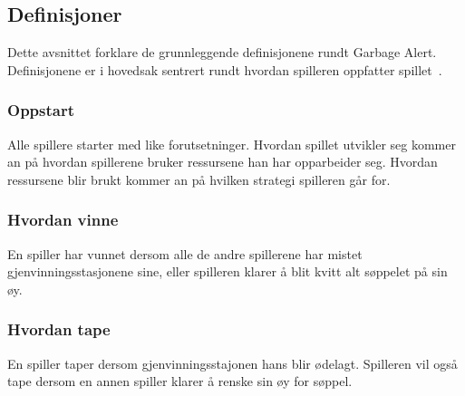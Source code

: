 \subsection{Definisjoner}
Dette avsnittet forklare de grunnleggende definisjonene rundt Garbage
Alert. Definisjonene er i hovedsak sentrert rundt hvordan spilleren
oppfatter spillet~\cite{gameplay}.
\subsubsection{Oppstart} Alle spillere starter med like forutsetninger.
Hvordan spillet utvikler seg kommer an på hvordan spillerene bruker
ressursene han har opparbeider seg. Hvordan ressursene blir brukt kommer
an på hvilken strategi spilleren går for.
\subsubsection{Hvordan vinne}
En spiller har vunnet dersom alle de andre spillerene har mistet
gjenvinningsstasjonene sine, eller spilleren klarer å blit kvitt alt
søppelet på sin øy.
\subsubsection{Hvordan tape}
En spiller taper dersom gjenvinningsstajonen hans blir ødelagt. Spilleren
vil også tape dersom en annen spiller klarer å renske sin øy for søppel.

